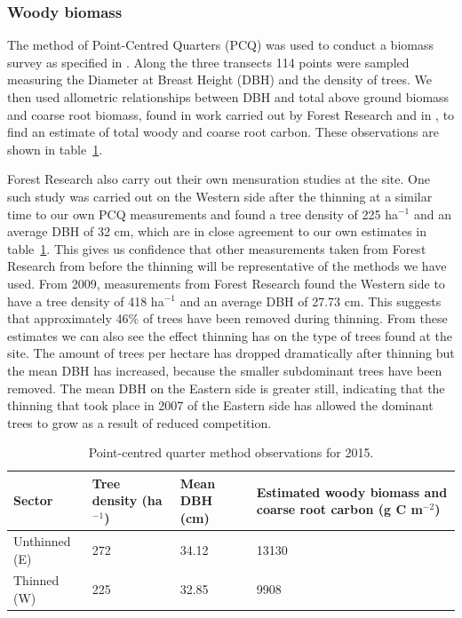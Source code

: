 \documentclass[draft,linenumbers]{agujournal}
\begin{document}
\subsubsection{Woody biomass}  
The method of Point-Centred Quarters (PCQ) was used to conduct a biomass survey as specified in \citet{dahdouh2006empirical}. Along the three transects 114 points were sampled measuring the Diameter at Breast Height (DBH) and the density of trees. We then used allometric relationships between DBH and total above ground biomass and coarse root biomass, found in work carried out by Forest Research and in \citet{mckay2003woodfuel}, to find an estimate of total woody and coarse root carbon. These observations are shown in table~\ref{table:cwoo_obs}.

Forest Research also carry out their own mensuration studies at the site. One such study was carried out on the Western side after the thinning at a similar time to our own PCQ measurements and found a tree density of 225 ha\(^{-1}\) and an average DBH of 32 cm, which are in close agreement to our own estimates in table~\ref{table:cwoo_obs}. This gives us confidence that other measurements taken from Forest Research from before the thinning will be representative of the methods we have used. From 2009, measurements from Forest Research found the Western side to have a tree density of 418 ha\(^{-1}\) and an average DBH of 27.73 cm. This suggests that approximately 46\% of trees have been removed during thinning. From these estimates we can also see the effect thinning has on the type of trees found at the site. The amount of trees per hectare has dropped dramatically after thinning but the mean DBH has increased, because the smaller subdominant trees have been removed. The mean DBH on the Eastern side is greater still, indicating that the thinning that took place in 2007 of the Eastern side has allowed the dominant trees to grow as a result of reduced competition.

\begin{table}[ht] 
	\caption{Point-centred quarter method observations for 2015.}
\begin{center}
	\begin{tabular}{| l | p{2cm} | p{2cm} | p{4.5cm} |}
	\hline
	Sector & Tree density (ha\(^{-1}\)) & Mean DBH (cm) & Estimated woody biomass and coarse root carbon (g C m\(^{-2}\)) \\ \hline
	Unthinned (E) & 272 & 34.12 & 13130 \\ \hline
	Thinned (W) & 225 & 32.85 & 9908 \\ \hline
	\end{tabular}
	\label{table:cwoo_obs}
\end{center} 
\end{table}
\end{document}
